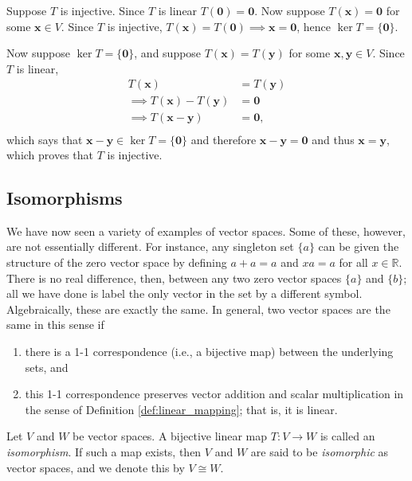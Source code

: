\documentclass[12pt,letterpaper,reqno]{article}
\numberwithin{equation}{section}
\newcommand{\R}{\ensuremath{\mathbb R}}
\newcommand{\fixme}[1]{{\color{orange}{[#1]}}}
\begin{document}
\begin{pf}
Suppose $T$ is injective. Since $T$ is linear $T(\mathbf{0})=\mathbf{0}$. Now suppose $T(\mathbf{x})=\mathbf{0}$ for some $\mathbf{x} \in V$. Since $T$ is injective, $T(\mathbf{x})=T(\mathbf{0}) \implies \mathbf{x}=\mathbf{0}$, hence $\ker T=\{\mathbf{0}\}$.

Now suppose $\ker T=\{\mathbf{0}\}$, and suppose $T(\mathbf{x})=T(\mathbf{y})$ for some $\mathbf{x}, \mathbf{y} \in V$. Since $T$ is linear,
\begin{align*}
	T(\mathbf{x})&=T(\mathbf{y}) \\
	\implies T(\mathbf{x})-T(\mathbf{y})&=\mathbf{0} \\
	\implies T(\mathbf{x}-\mathbf{y})&=\mathbf{0}, \\
\end{align*}
which says that $\mathbf{x}-\mathbf{y} \in \ker T=\{\mathbf{0}\}$ and therefore $\mathbf{x}-\mathbf{y}=\mathbf{0}$ and thus $\mathbf{x}=\mathbf{y}$, which proves that $T$ is injective. 
\end{pf}

\fixme{Include example.}


\subsection{Isomorphisms}
We have now seen a variety of examples of vector spaces. Some of these, however, are not essentially different. For instance, any singleton set $\{a\}$ can be given the structure of the zero vector space by defining $a+a=a$ and $xa=a$ for all $x \in \R$. There is no real difference, then, between any two zero vector spaces $\{a\}$ and $\{b\}$; all we have done is label the only vector in the set by a different symbol. Algebraically, these are exactly the same. In general, two vector spaces are the same in this sense if 
\begin{enumerate}
	\item there is a 1-1 correspondence (i.e., a bijective map) between the underlying sets, and
	\item this 1-1 correspondence preserves vector addition and scalar multiplication in the sense of Definition \ref{def:linear_mapping}; that is, it is linear. 
\end{enumerate}

\begin{defn}[Isomorphism]
	Let $V$ and $W$ be vector spaces. A bijective linear map $T:V \to W$ is called an \emph{isomorphism}. If such a map exists, then $V$ and $W$ are said to be \emph{isomorphic} as vector spaces, and we denote this by $V \cong W$.
\end{defn}
\end{document}
